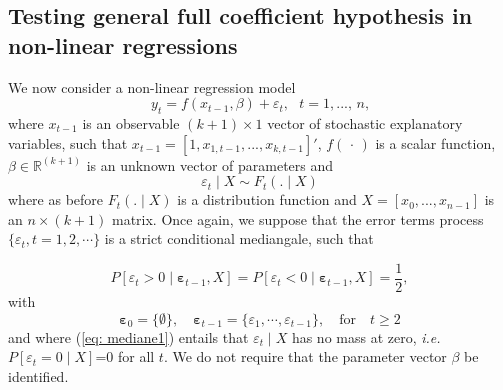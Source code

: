 \documentclass[harvard,11pt]{article}
\begin{document}
\subsection{Testing general full coefficient hypothesis in non-linear regressions \label{non-linear}}
We now consider a non-linear regression model%
\begin{equation}
y_{t}=f(x_{t-1},\beta )+\varepsilon_{t},\text{ }t=1,...,\,n\text{,}
\label{eq: modelnl}
\end{equation}%
where $x_{t-1}$ is an observable $(k+1)\times 1$ vector of stochastic
explanatory variables, such that $x_{t-1}=[1,x_{1,t-1},...,x_{k,t-1}]'$, $f(\,\cdot \,)$ is a scalar function, $\beta \in 
\mathbb{R}^{(k+1)}$ is an unknown vector of parameters and
\begin{equation*}
\varepsilon_{t}\mid X \sim F_{t}(.\mid X)
\end{equation*}%
where as before $F_{t}(.\mid X)$ is a distribution function and $X=[x_0,...,x_{n-1}]$ is an $n\times (k+1)$ matrix. Once again, we suppose that the error terms process $\{\varepsilon_t,t=1,2,\cdots\}$ is a strict conditional mediangale, such that

\begin{equation}\label{eq: mediane1}
P[\varepsilon_{t}> 0\mid \bm{{\varepsilon}}_{t-1},X]=P[\varepsilon_{t}<0\mid \bm{\varepsilon}_{t-1},X]=\frac{1}{2},
\end{equation}%
with
\[
\bm{\varepsilon}_{0}=\{\emptyset\},\quad\bm{\varepsilon}_{t-1}=\{\varepsilon_1,\cdots,\varepsilon_{t-1}\},\quad\text{for}\quad t\geq2
\]
and where (\ref{eq: mediane1}) entails that $\varepsilon_t\mid X$ has no mass at zero, \emph{i.e.} $P[\varepsilon_t=0\mid X]$=0 for all $t$. We do not require that the
parameter vector $\beta $ be identified. 
\end{document}
